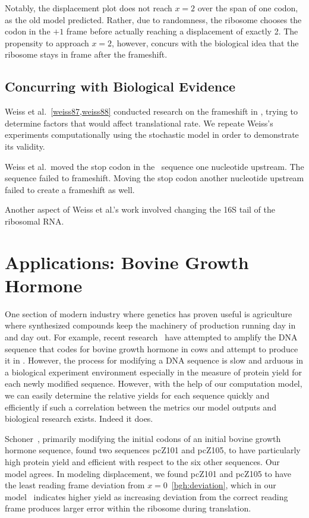 \documentclass[12pt, draft]{article}
\numberwithin{equation}{section}
\begin{document}
Notably, the displacement plot does not reach $x=2$ over the span of one codon, as the old model predicted.
Rather, due to randomness, the ribosome chooses the codon in the $+1$ frame before actually reaching a displacement of exactly 2.
The propensity to approach $x=2$, however, concurs with the biological idea that the ribosome stays in frame after the frameshift.

\subsection{Concurring with Biological Evidence}

Weiss et al.~\ref{weiss87,weiss88} conducted research on the frameshift in \prfB, trying to determine factors that would affect translational rate.
We repeate Weiss's experiments computationally using the stochastic model in order to demonstrate its validity.


Weiss et al.\ moved the stop codon in the \prfB\ sequence one nucleotide upstream.  
The sequence failed to frameshift.  
Moving the stop codon another nucleotide upstream failed to create a frameshift as well.


Another aspect of Weiss et al.'s work involved changing the 16S tail of the ribosomal RNA.


\section{Applications: Bovine Growth Hormone}
One section of modern industry where genetics has proven useful is
agriculture where synthesized compounds keep the machinery of
production running day in and day out. For example, recent
research~\cite{schoner:bgh} have attempted to amplify the DNA sequence
that codes for bovine growth hormone in cows and attempt to produce it
in \ecoli. However, the process for modifying a DNA sequence is slow
and arduous in a biological experiment environment especially in the
measure of protein yield for each newly modified sequence. However,
with the help of our computation model, we can easily determine the
relative yields for each sequence quickly and efficiently if such a
correlation between the metrics our model outputs and biological
research exists. Indeed it does.

Schoner~\cite{schoner:bgh}, primarily modifying the initial codons of an initial
bovine growth hormone sequence, found two sequences pcZ101 and pcZ105,
to have particularly high protein yield and efficient with respect to
the six other sequences. Our model agrees. In modeling displacement,
we found pcZ101 and pcZ105 to have the least reading frame deviation
from $x = 0$~\ref{bgh:deviation}, which in our model~\cite{lalit:mechanics} indicates
higher yield as increasing deviation from the correct reading frame
produces larger error within the ribosome during translation.
\end{document}
